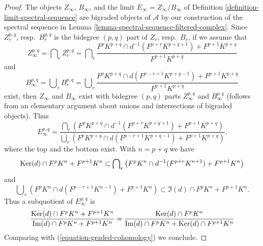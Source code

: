 \begin{proof}
The objects $Z_\infty$, $B_\infty$, and the limit
$E_\infty = Z_\infty/B_\infty$ of
Definition \ref{definition-limit-spectral-sequence}
are bigraded objects of $\mathcal{A}$ by our construction of the
spectral sequence in Lemma \ref{lemma-spectral-sequence-filtered-complex}.
Since $Z_r^{p, q}$, resp.\ $B_r^{p, q}$ is the bidegree $(p, q)$
part of $Z_r$, resp.\ $B_r$, if we assume that
$$
Z_\infty^{p, q} = \bigcap\nolimits_r Z_r^{p, q} =
\bigcap\nolimits_r
\frac{F^pK^{p + q} \cap d^{-1}(F^{p + r}K^{p + q + 1}) + F^{p + 1}K^{p + q}}
{F^{p + 1}K^{p + q}}
$$
and
$$
B_\infty^{p, q} = \bigcup\nolimits_r B_r^{p, q} =
\bigcup\nolimits_r
\frac{F^pK^{p + q} \cap d(F^{p - r + 1}K^{p + q - 1}) + F^{p + 1}K^{p + q}}
{F^{p + 1}K^{p + q}}
$$
exist, then $Z_\infty$ and $B_\infty$ exist with bidegree $(p, q)$
parts $Z_\infty^{p, q}$ and $B_\infty^{p, q}$ (follows from an elementary
argument about unions and intersections of bigraded objects). Thus
$$
E_\infty^{p, q} =
\frac{\bigcap_r (F^pK^{p + q} \cap d^{-1}(F^{p + r}K^{p + q + 1})
+ F^{p + 1}K^{p + q})}
{\bigcup_r (F^pK^{p + q} \cap d(F^{p - r + 1}K^{p + q - 1})
+ F^{p + 1}K^{p + q})}.
$$
where the top and the bottom exist. With $n = p + q$ we have
\begin{equation}
\label{equation-on-top-bigraded}
\mathop{\mathrm{Ker}}(d) \cap F^pK^{n} + F^{p + 1}K^{n}
\subset
\bigcap\nolimits_r
\left(
F^pK^{n} \cap d^{-1}(F^{p + r}K^{n + 1}) + F^{p + 1}K^{n}
\right)
\end{equation}
and
\begin{equation}
\label{equation-at-bottom-bigraded}
\bigcup\nolimits_r
\left(
F^pK^{n} \cap d(F^{p - r + 1}K^{n - 1}) + F^{p + 1}K^{n}
\right)
\subset
\Im(d) \cap F^pK^{n} + F^{p + 1}K^{n}.
\end{equation}
Thus a subquotient of $E_\infty^{p, q}$ is
$$
\frac{\mathop{\mathrm{Ker}}(d) \cap F^pK^{n} + F^{p + 1}K^n}
{\mathop{\mathrm{Im}}(d) \cap F^pK^{n} + F^{p + 1}K^{n}} =
\frac{\mathop{\mathrm{Ker}}(d) \cap F^pK^n}{\mathop{\mathrm{Im}}(d) \cap F^pK^n + \mathop{\mathrm{Ker}}(d) \cap F^{p + 1}K^n}
$$
Comparing with (\ref{equation-graded-cohomology}) we conclude.
\end{proof}

